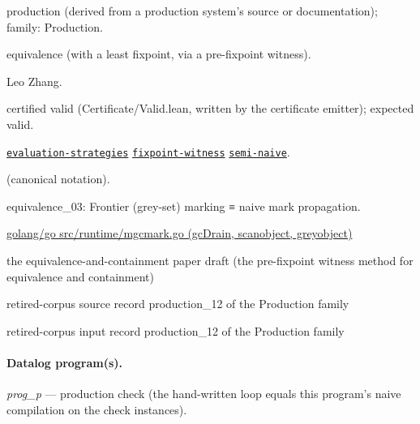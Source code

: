\documentclass[10pt]{article}
\begin{document}
\begin{description}[leftmargin=2.6cm,style=nextline,itemsep=1pt]

\item[Category] production (derived from a production system's source or documentation); family: Production.

\item[Kind] equivalence (with a least fixpoint, via a pre-fixpoint witness).

\item[Contributors] Leo Zhang.

\item[Status] certified valid (Certificate/Valid.lean, written by the certificate emitter); expected valid.

\item[Tags] \hyperref[tag:evaluation-strategies]{\texttt{evaluation-strategies}} \hyperref[tag:fixpoint-witness]{\texttt{fixpoint-witness}} \hyperref[tag:semi-naive]{\texttt{semi-naive}}.

\item[Input]  (canonical notation).

\item[Summary] equivalence\_03: Frontier (grey-set) marking ≡ naive mark propagation.

\item[Sources] {\raggedright \href{https://github.com/golang/go/blob/master/src/runtime/mgcmark.go}{golang/go src/runtime/mgcmark.go (gcDrain, scanobject, greyobject)} \par the equivalence-and-containment paper draft (the pre-fixpoint witness method for equivalence and containment) \par retired-corpus source record production\_12 of the Production family \par retired-corpus input record production\_12 of the Production family\par}

\end{description}

\paragraph{Datalog program(s).}

{\raggedright\textit{prog\_p} --- production check (the hand-written loop equals this program's naive compilation on the check instances).\par}
\end{document}
